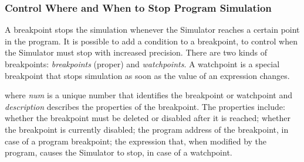 \documentclass[twoside]{tceusermanual}
\begin{document}
\subsubsection{Control Where and When to Stop Program Simulation}
\label{ssec:debug-breakpoints}

A breakpoint stops the simulation whenever the Simulator reaches a certain
point in the program. It is possible to add a condition to a breakpoint, to
control when the Simulator must stop with increased precision. There are two
kinds of breakpoints: \emph{breakpoints} (proper) and \emph{watchpoints}. A
watchpoint is a special breakpoint that stops simulation as soon as the
value of an expression changes.

%
where \emph{num} is a unique number that identifies the breakpoint or
watchpoint and \emph{description} describes the properties of the
breakpoint. The properties include: whether the breakpoint must be deleted
or disabled after it is reached; whether the breakpoint is currently
disabled; the program address of the breakpoint, in case of a program
breakpoint; the expression that, when modified by the program, causes the
Simulator to stop, in case of a watchpoint.
\end{document}
